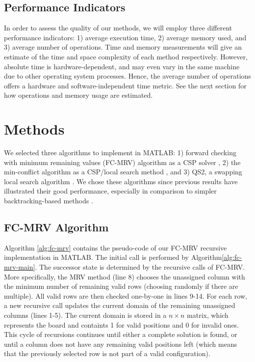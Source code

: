 \subsection{Performance Indicators}

In order to assess the quality of our methods, we will employ three different performance indicators: 1) average execution time, 2) average memory used, and 3) average number of operations. Time and memory measurements will give an estimate of the time and space complexity of each method respectively. However, absolute time is hardware-dependent, and may even vary in the same machine due to other operating system processes. Hence, the average number of operations offers a hardware and software-independent time metric. See the next section for how operations and memory usage are estimated.


\section{Methods}
\label{sec:methods}

We selected three algorithms to implement in MATLAB: 1) forward checking with minimum remaining values (FC-MRV) algorithm as a CSP solver \citep{aima}, 2) the min-conflict algorithm as a CSP/local search method  \citep{aima}, and 3) QS2, a swapping local search algorithm \citep{sosic91}. We chose these algorithms since previous results have illustrated their good performance, especially in comparison to simpler backtracking-based methods \citep{aima, sosic91}.

\subsection{FC-MRV Algorithm}

Algorithm \ref{alg:fc-mrv} contains the pseudo-code of our FC-MRV recursive implementation in MATLAB. The initial call is performed by Algorithm\ref{alg:fc-mrv-main}. The successor state is determined by the recursive calls of FC-MRV. More specifically, the MRV method (line 8) chooses the unassigned column with the minimum number of remaining valid rows (choosing randomly if there are multiple). All valid rows are then checked one-by-one in lines 9-14. For each row, a new recursive call updates the current domain of the remaining unassigned columns (lines 1-5). The current domain is stored in a $n\times n$ matrix, which represents the board and containts 1 for valid positions and 0 for invalid ones. This cycle of recursions continues until either a complete solution is found, or until a column does not have any remaining valid positions left (which means that the previously selected row is not part of a valid configuration).

